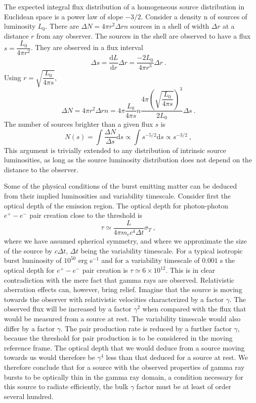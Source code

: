 \documentclass[12pt,a4paper]{article}
\newcommand{\dif}{\mathrm{d}}
\begin{document}
\cite{courvoisier2012high}  The expected integral flux distribution of a homogeneous source distribution in Euclidean space is a power law of slope $-3/2$. Consider a density n of sources of luminosity $L_0$. There are $\Delta N = 4\pi r^2 \Delta r n$ sources in a shell of width $\Delta r$ at a distance  $r$ from any observer. The sources in the shell are observed to have a flux $s = \dfrac{L_0}{4\pi r^2}$. They are observed in a flux interval
\begin{equation}
\Delta s = \dfrac{\dif L}{\dif r} \Delta r = \dfrac{-2L_0}{4\pi r^3} \Delta r ~.
\end{equation}
Using $r = \sqrt{\dfrac{L_0}{4\pi s}}$, 
\begin{equation}
\Delta N = 4\pi r^2 \Delta r n = 4\pi \dfrac{L_0}{4\pi s} n \dfrac{4\pi (\sqrt{\dfrac{L_0}{4\pi s}})^3}{2L_0} \Delta s ~.
\end{equation}
The number of sources brighter than a given flux $s$ is 
\begin{equation}
N(s) = \int \dfrac{\Delta N}{\Delta s} \dif s \propto \int s^{-5/2} \dif s \propto s^{-3/2} ~,
\end{equation}
This argument is trivially extended to any distribution of intrinsic source luminosities, as long as the source luminosity distribution does not depend on the distance to the observer.

Some of the physical conditions of the burst emitting matter can be deduced from their implied luminosities and variability timescale. Consider first the optical depth of the emission region. The optical depth for photon-photon $e^+ - e^-$ pair creation close to the threshold is
\begin{equation}
\tau \simeq \dfrac{L}{4\pi m_e c^4 \Delta t} \sigma_T ~,
\end{equation}
where we have assumed spherical symmetry, and where we approximate the size of the source by $c \Delta t$, $\Delta t$ being the variability timescale. For a typical isotropic burst luminosity of $10^{50}$ erg s$^{-1}$ and for a variability timescale of $0.001$ s the optical depth for $e^+ - e^-$ pair creation is $\tau \simeq 6 \times 10^{12}$. This is in clear contradiction with the mere fact that gamma rays are observed. Relativistic aberration effects can, however, bring relief. Imagine that the source is moving towards the observer with relativistic velocities characterized by a factor $\gamma$. The observed flux will be increased by a factor $\gamma^2$ when compared with the flux that would be measured from a source at rest. The variability timescale would also differ by a factor $\gamma$. The pair production rate is reduced by a further factor $\gamma$, because the threshold for pair production is to be considered in the moving reference frame. The optical depth that we would deduce from a source moving towards us would therefore be $\gamma^4$ less than that deduced for a source at rest. We therefore conclude that for a source with the observed properties of gamma ray bursts to be optically thin in the gamma ray domain, a condition necessary for this source to radiate efficiently, the bulk $\gamma$ factor must be at least of order several hundred.
\end{document}
